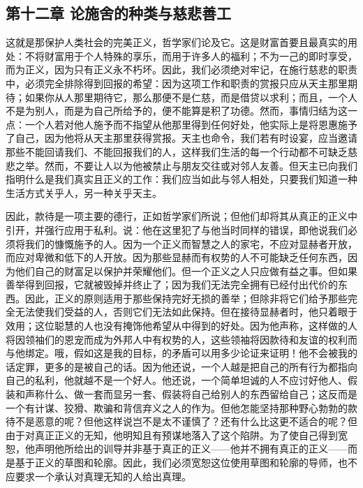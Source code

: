 
\subsection{第十二章 论施舍的种类与慈悲善工}

这就是那保护人类社会的完美正义，哲学家们论及它。这是财富首要且最真实的用处：不将财富用于个人特殊的享乐，而用于许多人的福利；不为一己的即时享受，而为正义，因为只有正义永不朽坏。因此，我们必须绝对牢记，在施行慈悲的职责中，必须完全排除得到回报的希望：因为这项工作和职责的赏报只应从天主那里期待；如果你从人那里期待它，那么那便不是仁慈，而是借贷以求利；而且，一个人不是为别人，而是为自己所给予的，便不能算是积了功德。然而，事情归结为这一点：一个人若对他人施予而不指望从他那里得到任何好处，他实际上是将恩惠施予了自己，因为他将从天主那里获得赏报。天主也命令，我们若有时设宴，应当邀请那些不能回请我们、不能回报我们的人，这样我们生活的每一个行动都不可缺乏慈悲之举。然而，不要让人以为他被禁止与朋友交往或对邻人友善。但天主已向我们指明什么是我们真实且正义的工作：我们应当如此与邻人相处，只要我们知道一种生活方式关乎人，另一种关乎天主。\par

因此，款待是一项主要的德行，正如哲学家们所说；但他们却将其从真正的正义中引开，并强行应用于私利。说：他在这里犯了与他当时同样的错误，即他说我们必须将我们的慷慨施予的人。因为一个正义而智慧之人的家宅，不应对显赫者开放，而应对卑微和低下的人开放。因为那些显赫而有权势的人不可能缺乏任何东西，因为他们自己的财富足以保护并荣耀他们。但一个正义之人只应做有益之事。但如果善举得到回报，它就被毁掉并终止了；因为我们无法完全拥有已经付出代价的东西。因此，正义的原则适用于那些保持完好无损的善举；但除非将它们给予那些完全无法使我们受益的人，否则它们无法如此保持。但在接待显赫者时，他只着眼于效用；这位聪慧的人也没有掩饰他希望从中得到的好处。因为他声称，这样做的人将因领袖们的恩宠而成为外邦人中有权势的人，这些领袖将因款待和友谊的权利而与他绑定。哦，假如这是我的目标，的矛盾可以用多少论证来证明！他不会被我的话定罪，更多的是被自己的话。因为他还说，一个人越是把自己的所有行为都指向自己的私利，他就越不是一个好人。他还说，一个简单坦诚的人不应讨好他人、假装和声称什么、做一套而显另一套、假装将自己给别人的东西留给自己；这反而是一个有计谋、狡猾、欺骗和背信弃义之人的作为。但他怎能坚持那种野心勃勃的款待不是恶意的呢？但他这样说岂不是太不谨慎了？还有什么比这更不适合的呢？但由于对真正正义的无知，他明知且有预谋地落入了这个陷阱。为了使自己得到宽恕，他声明他所给出的训导并非基于真正的正义——他并不拥有真正的正义——而是基于正义的草图和轮廓。因此，我们必须宽恕这位使用草图和轮廓的导师，也不应要求一个承认对真理无知的人给出真理。\par

